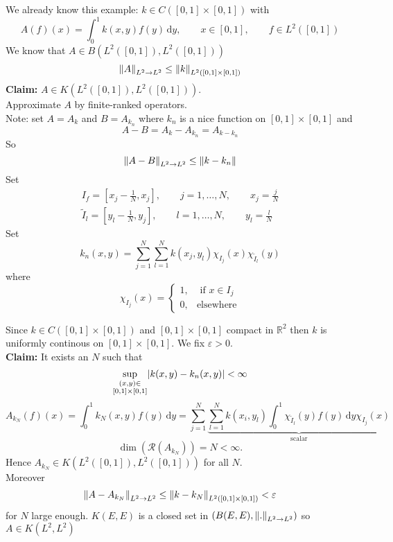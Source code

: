 \begin{beispiel}
	We already know this example: $k \in C([0,1] \times [0,1])$ with
	\[
		A(f)(x) = \int_{0}^{1} k(x,y)f(y) \,\mathrm{d}y, \qquad x \in [0,1], \qquad f \in L^2([0,1])
	\]
	We know that $A \in B(L^2([0,1]), L^2([0,1]))$ 
	\[
		\norm{A}_{L^2 \to L^2} \leq \norm{k}_{L^2([0,1] \times [0,1])}
	\]
	\textbf{Claim:} \text{    }$A \in K(L^2([0,1]),L^2([0,1]))$. \\
	Approximate $A$ by finite-ranked operators. \\
	Note: set $A = A_k$ and $B = A_{k_n}$ where $k_n$ is a nice function on $[0,1] \times [0,1]$ and
	\[
		A-B = A_k - A_{k_n} = A_{k-k_n}
	\]
	So \[
		\norm{A-B}_{L^2 \to L^2} \leq \norm{k - k_n}
	\]
	Set \begin{align*}
		I_f = [x_j - \frac{1}{N}, x_j], \qquad j = 1, \dots, N, \qquad x_j = \frac{j}{N} \\
		\tilde I_l =[y_l - \frac{1}{N}, y_j], \qquad l = 1, \dots, N, \qquad y_l = \frac{l}{N} 
	\end{align*}
	Set \[
		k_n(x,y) = \sum_{j=1}^{N} \sum_{l=1}^{N} k(x_j,y_l) \chi_{I_j}(x) \chi_{\tilde I_l}(y)
	\]
	where \[
		\chi_{I_j}(x) = \begin{cases}
			1, &\text{ if }x \in I_j\\
			0, &\text{elsewhere}
		\end{cases}
	\]
\end{beispiel}
Since $k \in C([0,1] \times [0,1])$ and $[0,1] \times [0,1]$ compact in $\mathbb{R}^2$ then $k$ is uniformly continous on $[0,1] \times [0,1]$. We fix $\varepsilon >0$. \\
\textbf{Claim:} \text{    }It exists an $N$ such that
\[
	\sup_{\substack{(x,y) \in  \\ [0,1] \times [0,1]}} \lvert k(x,y)- k_n(x,y)\rvert < \infty
\]
\[
	A_{k_N}(f)(x) = \int_{0}^{1} k_N(x,y) f(y) \,\mathrm{d}y = \sum_{j=1}^{N} \underset{\text{scalar}}{\underbrace{\sum_{l=1}^{N} k(x_i,y_l) \int_{0}^{1} \chi_{\tilde I_l}(y) f(y) \,\mathrm{d}y \chi_{I_j}(x)}}
\]
\[
	\dim(\mathcal{R}(A_{k_N})) = N < \infty.
\]
Hence $A_{k_N} \in K(L^2([0,1]), L^2([0,1]))$ for all $N$. \\
Moreover 
\[
	\norm{A-A_{k_N}}_{L^2 \to L^2} \leq \norm{k - k_N}_{L^2([0,1] \times [0,1])} < \varepsilon
\] 
for $N$ large enough. $K(E,E)$ is a closed set in $(B(E,E), \norm{.}_{L^2 \to L^2})$ so $A \in K(L^2,L^2)$

